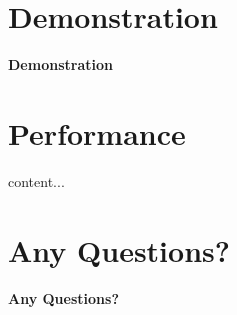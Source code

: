 \documentclass[xcolor={usenames,dvipsnames,svgnames}]{beamer}
\begin{document}
\nohead
\section{Demonstration}
\begin{frame}

{\Huge\bfseries Demonstration}
\end{frame}

\startheads
\section{Performance}
\begin{frame}
content...
\end{frame}


\nohead 
\section{Any Questions?}
\begin{frame}

{\Huge\bfseries Any Questions?}
\end{frame}

\end{document}
